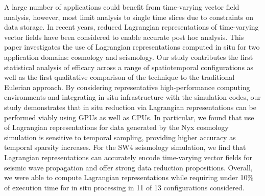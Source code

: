 A large number of applications could benefit from time-varying vector field analysis, however, most limit analysis to single time slices due to constraints on data storage.
%
In recent years, reduced Lagrangian representations of time-varying vector fields have been considered to enable accurate post hoc analysis.
%
%
%
This paper investigates the use of Lagrangian representations computed in situ for two application domains: cosmology and seismology.
%
%
Our study contributes the first statistical analysis of efficacy across a range of spatiotemporal configurations as well as the first qualitative comparison of the technique to the traditional Eulerian approach.
%
By considering representative high-performance computing environments and integrating in situ infrastructure with the simulation codes, our study demonstrates that in situ reduction via Lagrangian representations can be performed viably using GPUs as well as CPUs.
%
In particular, we found that use of Lagrangian representations for data generated by the Nyx cosmology simulation is sensitive to temporal sampling, providing higher accuracy as temporal sparsity increases.
%
For the SW4 seismology simulation, we find that Lagrangian representations can accurately encode time-varying vector fields for seismic wave propagation and offer strong data reduction propositions.
%
Overall, we were able to compute Lagrangian representations while requiring under 10\% of execution time for in situ processing in 11 of 13 configurations considered.
%
